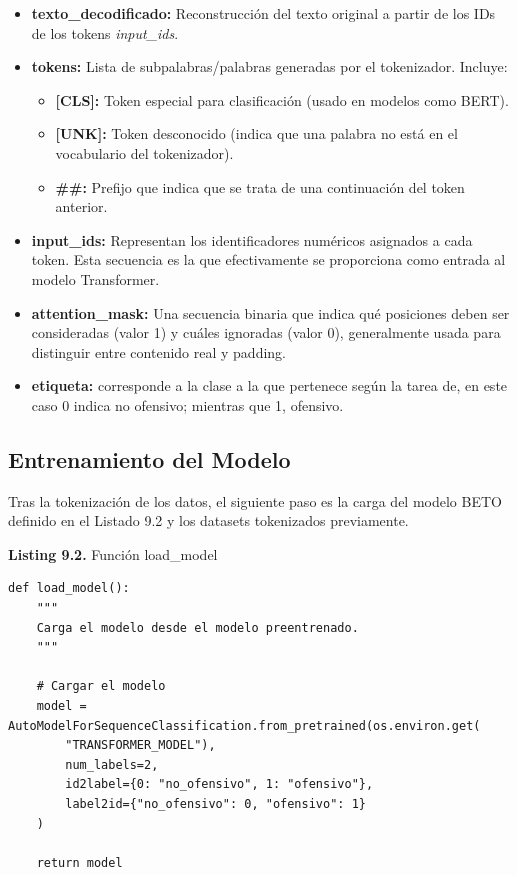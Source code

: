 \begin{itemize}
    \item \textbf{texto\_decodificado:} Reconstrucción del texto original a partir de los IDs de los tokens \textit{input\_ids}.

    \item \textbf{tokens:} Lista de subpalabras/palabras generadas por el tokenizador. Incluye:
    \begin{itemize}
        \item \textbf{[CLS]:} Token especial para clasificación (usado en modelos como BERT).
        \item \textbf{[UNK]:} Token desconocido (indica que una palabra no está en el vocabulario del tokenizador).
        \item \textbf{\#\#:} Prefijo que indica que se trata de una continuación del token anterior.
    \end{itemize}

    \item \textbf{input\_ids:} Representan los identificadores numéricos asignados a cada token. Esta secuencia es la que efectivamente se proporciona como entrada al modelo Transformer.

    \item \textbf{attention\_mask:} Una secuencia binaria que indica qué posiciones deben ser consideradas (valor 1) y cuáles ignoradas (valor 0), generalmente usada para distinguir entre contenido real y padding.

    \item \textbf{etiqueta:} corresponde a la clase a la que pertenece según la tarea de, en este caso 0 indica no ofensivo; mientras que 1, ofensivo.
\end{itemize}

\subsection{Entrenamiento del Modelo}

Tras la tokenización de los datos, el siguiente paso es la carga del modelo BETO definido en el Listado 9.2 y los datasets tokenizados previamente.

\begin{center}
\textbf{Listing 9.2.} Función load\_model
\end{center}

\begin{lstlisting}[style=pythoncode]
def load_model():
    """
    Carga el modelo desde el modelo preentrenado.
    """

    # Cargar el modelo
    model = AutoModelForSequenceClassification.from_pretrained(os.environ.get(
        "TRANSFORMER_MODEL"),
        num_labels=2,
        id2label={0: "no_ofensivo", 1: "ofensivo"},
        label2id={"no_ofensivo": 0, "ofensivo": 1}
    )

    return model
\end{lstlisting}

